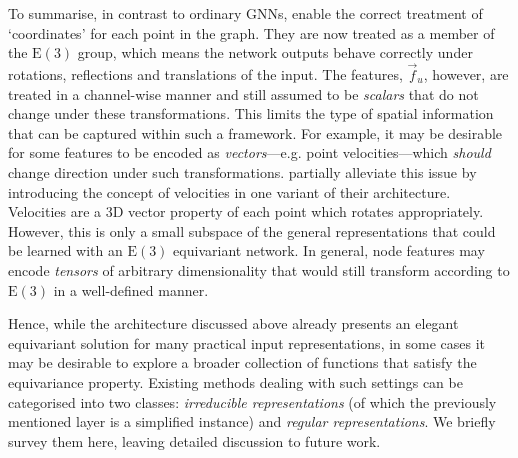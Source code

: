 To summarise, in contrast to ordinary GNNs, \cite{satorras2021n} enable the correct treatment of `coordinates' for each point in the graph. They are now treated as a member of the $\mathrm{E}(3)$ group, which means the network outputs behave correctly under rotations, reflections and translations of the input. The features, $\vec{f}_u$, however, are treated in a channel-wise manner and still assumed to be \emph{scalars} that do not change under these transformations. 
%
This limits the type of spatial information that can be captured within such a framework. For example, it may be desirable for some features to be encoded as \emph{vectors}---e.g. point velocities---which \emph{should} change direction under such transformations. 
\cite{satorras2021n} partially alleviate this issue by introducing the concept of velocities in one variant of their architecture. Velocities are a 3D vector property of each point which rotates appropriately. However, this is only a small subspace of the general representations that could be learned with an $\mathrm{E}(3)$ equivariant network. In general, node features may encode \emph{tensors} of arbitrary dimensionality that would still transform according to $\mathrm{E}(3)$ in a well-defined manner.

Hence, while the architecture discussed above already presents an elegant equivariant solution for many practical input representations, in some cases it may be desirable to explore a broader collection of functions that satisfy the equivariance property. Existing methods dealing with such settings can be categorised into two classes: \emph{irreducible representations} (of which the previously mentioned layer is a simplified instance) and \emph{regular representations}. We briefly survey them here, leaving detailed discussion to future work.

